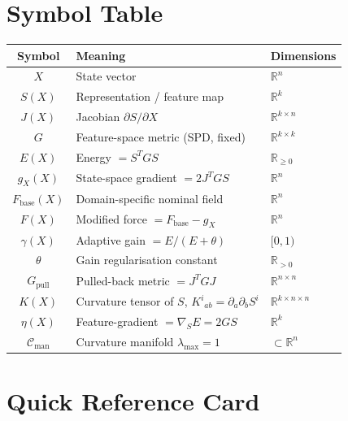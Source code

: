 \documentclass[11pt,oneside]{amsart}
\theoremstyle{plain}
\theoremstyle{definition}
\renewcommand{\arraystretch}{1.25}
\newcommand{\gX}{g_X}
\newcommand{\Fbase}{F_{\mathrm{base}}}
\newcommand{\Gpull}{G_{\mathrm{pull}}}
\newcommand{\Cman}{\mathcal{C}_{\mathrm{man}}}
\newcommand{\R}{\mathbb{R}}
\begin{document}
\section{Symbol Table}

\begin{center}
\renewcommand{\arraystretch}{1.4}
\begin{tabular}{>{\bfseries}c l l}
\toprule
Symbol & Meaning & Dimensions \\
\midrule
$X$        & State vector                        & $\R^{n}$ \\
$S(X)$     & Representation / feature map        & $\R^{k}$ \\
$J(X)$     & Jacobian $\partial S/\partial X$    & $\R^{k\times n}$ \\
$G$        & Feature-space metric (SPD, fixed)   & $\R^{k\times k}$ \\
$E(X)$     & Energy $= S^{T}GS$                  & $\R_{\geq 0}$ \\
$\gX(X)$   & State-space gradient $= 2J^{T}GS$   & $\R^{n}$ \\
$\Fbase(X)$& Domain-specific nominal field       & $\R^{n}$ \\
$F(X)$     & Modified force $= \Fbase - \gX$     & $\R^{n}$ \\
$\gamma(X)$& Adaptive gain $= E/(E+\theta)$      & $[0,1)$ \\
$\theta$   & Gain regularisation constant         & $\R_{>0}$ \\
$\Gpull$   & Pulled-back metric $= J^{T}GJ$       & $\R^{n\times n}$ \\
$K(X)$     & Curvature tensor of $S$, $K^{i}{}_{ab}=\partial_{a}\partial_{b}S^{i}$ & $\R^{k\times n\times n}$ \\
$\eta(X)$  & Feature-gradient $= \nabla_{S}E = 2GS$ & $\R^{k}$ \\
$\Cman$    & Curvature manifold $\lambda_{\max}=1$& $\subset\R^{n}$ \\
\bottomrule
\end{tabular}
\end{center}

\section{Quick Reference Card}
\end{document}
